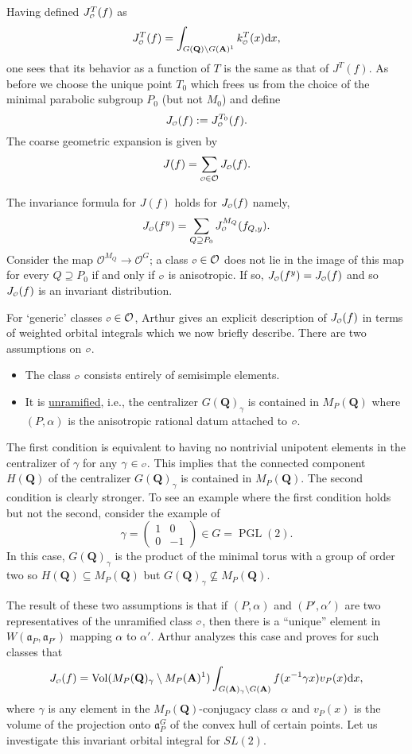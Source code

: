 \documentclass{ims9x6}
\def\A{\mathbf A}
\def\Q{\mathbf Q}
\def\O{\mathcal O}
\def\o{\scalebox{0.7}{$\scriptstyle\mathcal{O}$}}
\def\aaa{\mathfrak a}
\def\d{\text d}
\def\bs{\setminus}
\def\vol{\operatorname{Vol}}
\begin{document}
Having defined $J_{\o}^T(f)$ as
\[ J_{\o}^T(f) = \int_{G(\Q) \bs G(\A)^1} k_{\o}^T(x) \d x, \]
one sees that its behavior as a function of $T$ is the same as that of $J^T(f)$. As before we choose the unique point $T_0$ which frees us from the choice of the minimal parabolic subgroup $P_0$ (but not $M_0$) and define 
\[ J_{\o}(f) := J^{T_0}_{\o}(f). \]
The coarse geometric expansion is given by
\begin{equation} \label{coarse_geom}
	J(f) = \sum_{\o \in \O} J_{\o}(f). 
\end{equation}

\begin{remark}
	The invariance formula for $J(f)$ holds for $J_{\o}(f)$ namely,
	\[ J_{\o}(f^y) = \sum_{Q \supseteq P_0} J_{\o}^{M_Q}(f_{Q, y}). \]
	Consider the map $\O^{M_Q} \to \O^G$; a class $\o \in \O$ does not lie in the image of this map for every $Q \supseteq P_0$ if and only if $\o$ is anisotropic. If so, $J_{\o}(f^y) = J_{\o}(f)$ and so $J_{\o}(f)$ is an invariant distribution. 
\end{remark}

For `generic' classes $\o \in \O$, Arthur gives an explicit description of $J_{\o}(f)$ in terms of weighted orbital integrals which we now briefly describe. There are two assumptions on $\o$. 
\begin{itemize}
	\item The class $\o$ consists entirely of semisimple elements. 
	\item It is \underline{unramified}, i.e., the centralizer $G(\Q)_\gamma$ is contained in $M_P(\Q)$ where $(P, \alpha)$ is the anisotropic rational datum attached to $\o$. 
\end{itemize}
The first condition is equivalent to having no nontrivial unipotent elements in the centralizer of $\gamma$ for any $\gamma \in \o$. This implies that the connected component $H(\Q)$ of the centralizer $G(\Q)_\gamma$ is contained in $M_P(\Q)$. The second condition is clearly stronger. To see an example where the first condition holds but not the second, consider the example of 
\[ \gamma = \begin{pmatrix} 1 & 0 \\ 0 & -1 \end{pmatrix} \in G = \operatorname{PGL}(2). \]
In this case, $G(\Q)_\gamma$ is the product of the minimal torus with a group of order two so $H(\Q) \subseteq M_P(\Q)$ but $G(\Q)_\gamma \not\subseteq M_P(\Q)$. 

The result of these two assumptions is that if $(P, \alpha)$ and $(P', \alpha')$ are two representatives of the unramified class $\o$, then there is a ``unique'' element in $W(\aaa_P, \aaa_{P'})$ mapping $\alpha$ to $\alpha'$. Arthur analyzes this case \cite[\S 8]{duke} and proves for such classes that
\begin{equation} \label{jo_anis}
	J_{\o}(f) = \vol(M_P(\Q)_\gamma \bs M_P(\A)^1) \int_{G(\A)_\gamma \bs G(\A)} f(x^{-1} \gamma x) v_P(x) \d x, 
\end{equation}
where $\gamma$ is any element in the $M_P(\Q)$-conjugacy class $\alpha$ and $v_P(x)$ is the volume of the projection onto $\aaa_P^G$ of the convex hull of certain points. Let us investigate this invariant orbital integral for $SL(2)$. 
\end{document}
